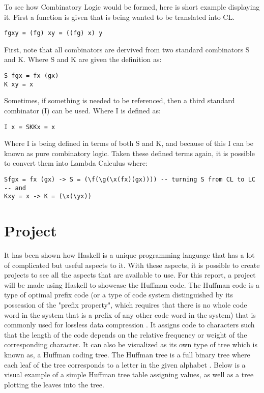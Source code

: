 \documentclass{article}
\begin{document}
\medskip\noindent
To see how Combinatory Logic would be formed, here is  short example displaying it.
First a function is given that is being wanted to be translated into CL.
\begin{lstlisting}
fgxy = (fg) xy = ((fg) x) y
\end{lstlisting}

First, note that all combinators are dervived from two standard combinators S and K.
Where S and K are given the definition as:

\begin{lstlisting}
S fgx = fx (gx)
K xy = x
\end{lstlisting}

Sometimes, if something is needed to be referenced, then a third standard combinator (I) can be used.
Where I is defined as:

\begin{lstlisting}
I x = SKKx = x
\end{lstlisting}
Where I is being defined in terms of both S and K, and because of this I can be known as pure combinatory logic.
Taken these defined terms again, it is possible to convert them into Lambda Calculus where:
\begin{lstlisting}
Sfgx = fx (gx) -> S = (\f(\g(\x(fx)(gx)))) -- turning S from CL to LC
-- and
Kxy = x -> K = (\x(\yx))
\end{lstlisting}



\section{Project}
It has been shown how Haskell is a unique programming language that has a lot of complicated but useful aspects to it. 
With these aspects, it is possible to create projects to see all the aspects that are available to use.
For this report, a project will be made using Haskell to showcase the Huffman code.
The Huffman code is a type of optimal prefix code (or a type of code system distinguished by its possession of the "prefix property", which requires that there is no whole code word in the system that is a prefix of any other code word in the system) that is commonly used for lossless data compression \cite{19}.
It assigns code to characters such that the length of the code depends on the relative frequency or weight of the corresponding character.
It can also be visualized as its own type of tree which is known as, a Huffman coding tree.
The Huffman tree is a full binary tree where each leaf of the tree corresponds to a letter in the given alphabet \cite{19}.
Below is a visual example of a simple Huffman tree table assigning values, as well as a tree plotting the leaves into the tree.
\end{document}
